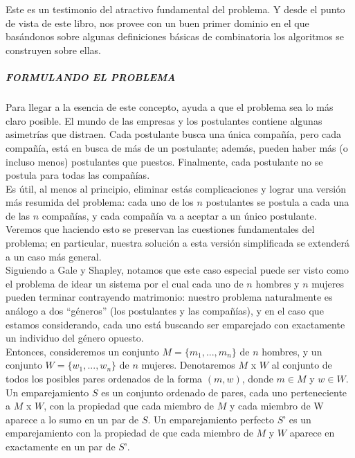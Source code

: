 \documentclass[a4paper]{article}
\begin{document}
\\
  \\
	Este es un testimonio del atractivo fundamental del problema. Y desde el punto de vista de este libro, nos provee con un buen primer dominio en el que basándonos sobre algunas definiciones básicas de combinatoria los algoritmos se construyen sobre ellas. 
\subparagraph{FORMULANDO EL PROBLEMA} Para llegar a la esencia de este concepto, ayuda a que el problema sea lo más claro posible. El mundo de las empresas y los postulantes contiene algunas asimetrías que distraen. Cada postulante busca una única compañía, pero cada compañía, está en busca de más de un postulante; además, pueden haber más (o incluso menos) postulantes que puestos. Finalmente, cada postulante no se postula para todas las compañías.\\

Es útil, al menos al principio, eliminar estás complicaciones y lograr una versión más resumida del problema: cada uno de los $n$ postulantes se postula a cada una de las $n$ compañías, y cada compañía va a aceptar a un único postulante. Veremos que haciendo esto se preservan las cuestiones fundamentales del problema; en particular, nuestra solución a esta versión simplificada se extenderá a un caso más general.\\

Siguiendo a Gale y Shapley, notamos que este caso especial puede ser visto como el problema de idear un sistema por el cual cada uno de $n$ hombres y $n$ mujeres pueden terminar contrayendo matrimonio: nuestro problema naturalmente es análogo a dos “géneros” (los postulantes y las compañías), y en el caso que estamos considerando, cada uno está buscando ser emparejado con exactamente un individuo del género opuesto.\\

Entonces, consideremos un conjunto $M =\{m_1, ...,m_n\}$ de $n$ hombres, y un conjunto  $W =\{w_1, ...,w_n\}$ de $n$ mujeres. Denotaremos $M$ x $W$ al conjunto de todos los posibles pares ordenados de la forma $(m, w)$, donde $m \in M$ y  $w \in W $. Un emparejamiento $S$ es un conjunto ordenado de pares, cada uno perteneciente a $M$ x $W$, con la propiedad que cada miembro de $M$ y cada miembro de W aparece a lo sumo en un par de $S$. Un emparejamiento perfecto $S’$ es un emparejamiento con la propiedad de que cada miembro de $M$ y $W$ aparece en exactamente en un par de $S’$.\\
 
\end{document}
